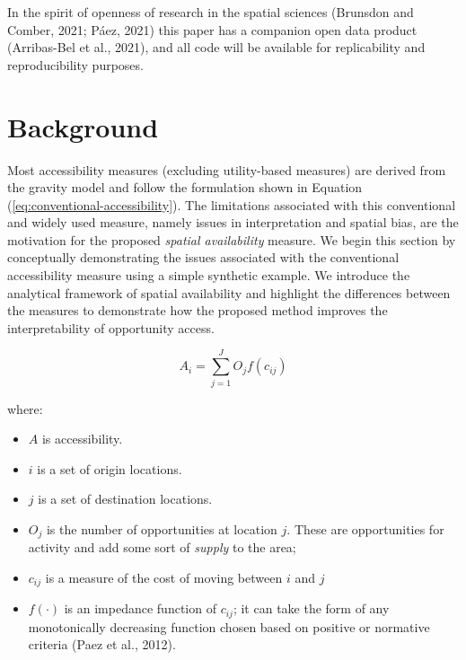 \documentclass[]{elsarticle} %
\providecommand{\tightlist}{%
  \setlength{\itemsep}{0pt}\setlength{\parskip}{0pt}}
\begin{document}
In the spirit of openness of research in the spatial sciences (Brunsdon
and Comber, 2021; Páez, 2021) this paper has a companion open data
product (Arribas-Bel et al., 2021), and all code will be available for
replicability and reproducibility purposes.

\hypertarget{background}{%
\section{Background}\label{background}}

Most accessibility measures (excluding utility-based measures) are
derived from the gravity model and follow the formulation shown in
Equation (\ref{eq:conventional-accessibility}). The limitations
associated with this conventional and widely used measure, namely issues
in interpretation and spatial bias, are the motivation for the proposed
\emph{spatial availability} measure. We begin this section by
conceptually demonstrating the issues associated with the conventional
accessibility measure using a simple synthetic example. We introduce the
analytical framework of spatial availability and highlight the
differences between the measures to demonstrate how the proposed method
improves the interpretability of opportunity access.

\begin{equation}
\label{eq:conventional-accessibility}
A_i = \sum_{j=1}^JO_jf(c_{ij})
\end{equation}

\noindent where:

\begin{itemize}
\tightlist
\item
  \(A\) is accessibility.
\item
  \(i\) is a set of origin locations.
\item
  \(j\) is a set of destination locations.
\item
  \(O_j\) is the number of opportunities at location \(j\). These are
  opportunities for activity and add some sort of \emph{supply} to the
  area;
\item
  \(c_{ij}\) is a measure of the cost of moving between \(i\) and \(j\)
\item
  \(f(\cdot)\) is an impedance function of \(c_{ij}\); it can take the
  form of any monotonically decreasing function chosen based on positive
  or normative criteria (Paez et al., 2012).
\end{itemize}
\end{document}
